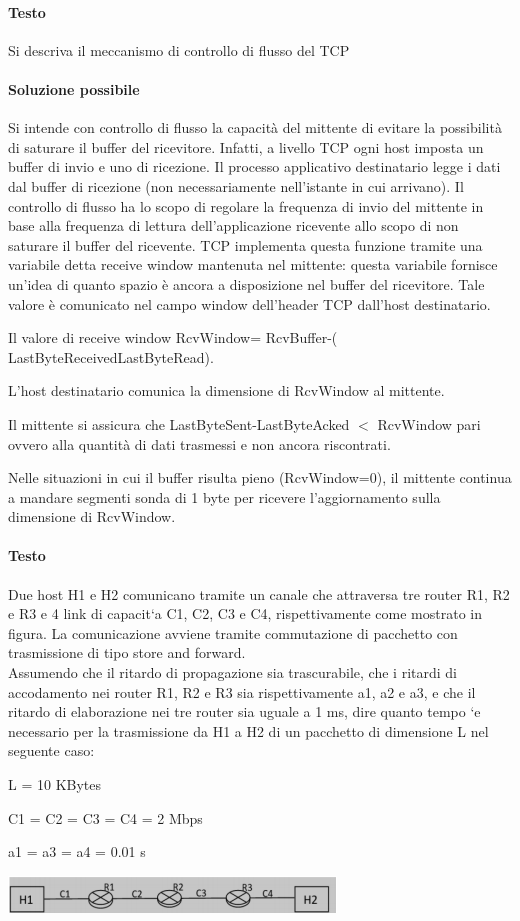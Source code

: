 \documentclass[10pt]{article}
\begin{document}
{\paragraph{Testo} Si descriva il meccanismo di controllo di flusso del TCP
\paragraph{Soluzione possibile}  Si intende con controllo di flusso la capacità del mittente di evitare la possibilità di saturare il buffer del ricevitore. Infatti, a livello TCP ogni host imposta un buffer di invio e uno di ricezione. Il processo applicativo destinatario legge i dati dal buffer di ricezione (non necessariamente nell’istante in cui arrivano). Il controllo di flusso ha lo scopo di regolare la frequenza di invio del mittente in base alla frequenza di lettura dell’applicazione ricevente allo scopo di non saturare il buffer del ricevente. TCP implementa questa funzione tramite una variabile detta receive window mantenuta nel mittente: questa variabile fornisce un’idea di quanto spazio è ancora a disposizione nel buffer del ricevitore. Tale valore è comunicato nel campo window dell’header TCP dall’host destinatario.
\begin{list}{}{}
\item Il valore di receive window RcvWindow= RcvBuffer-( LastByteReceivedLastByteRead).
\item L’host destinatario comunica la dimensione di RcvWindow al mittente.
\item Il mittente si assicura che LastByteSent-LastByteAcked $<$ RcvWindow pari ovvero alla quantità di dati trasmessi e non ancora riscontrati.
\end{list}
Nelle situazioni in cui il buffer risulta pieno (RcvWindow=0), il mittente continua a mandare segmenti sonda di 1 byte per ricevere l’aggiornamento sulla dimensione di RcvWindow.
\paragraph{Testo}  Due host H1 e H2 comunicano tramite un canale che attraversa tre router R1, R2 e R3 e 4 link di capacit`a C1, C2, C3 e C4, rispettivamente come mostrato in figura. La comunicazione avviene tramite commutazione di pacchetto con trasmissione di tipo store and forward.\\
Assumendo che il ritardo di propagazione sia trascurabile, che i ritardi di accodamento nei router R1, R2 e R3 sia rispettivamente a1, a2 e a3, e che il ritardo di elaborazione nei tre router sia uguale a 1 ms, dire quanto tempo `e necessario per la trasmissione da H1 a H2 di un pacchetto di dimensione L nel seguente caso:
\begin{list}{-}{}
\item L = 10 KBytes
\item C1 = C2 = C3 = C4 = 2 Mbps
\item a1 = a3 = a4 = 0.01 s
\end{list}
\begin{center}
\includegraphics[scale=1]{es_tcp6testo.png}
\end{center}
}
\end{document}
